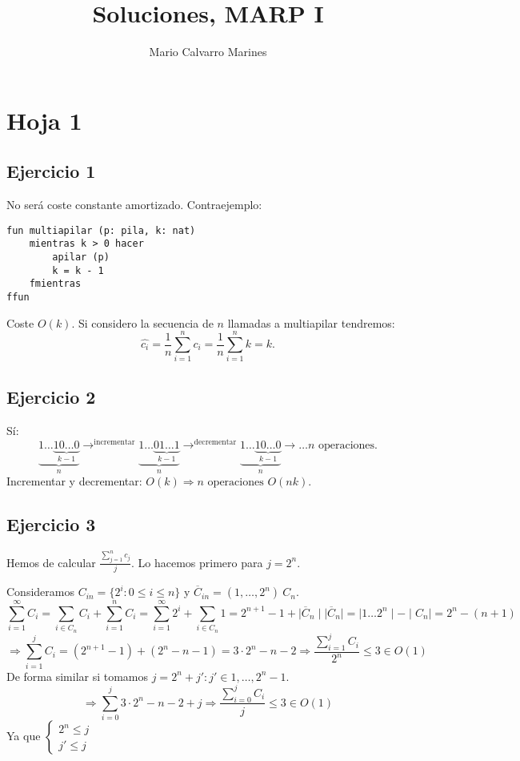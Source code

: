 \documentclass[10pt,a4paper,openright]{book}
\title{Soluciones, MARP I}
\author{Mario Calvarro Marines}
\date{}
\theoremstyle{break}
\begin{document}
\maketitle
\setcounter{tocdepth}{3}%
\tableofcontents
\chapter{Hoja 1}%
\label{cha:hoja_1}

\section{Ejercicio 1}%
\label{sec:ejercicio_1}
No será coste constante amortizado. Contraejemplo:
\begin{lstlisting}
fun multiapilar (p: pila, k: nat)
    mientras k > 0 hacer
        apilar (p)
        k = k - 1
    fmientras
ffun
\end{lstlisting}
Coste $O\left( k \right)$. Si considero la secuencia de $n$ llamadas a multiapilar tendremos:
\[
\hat{c_i} = \frac{1}{n} \sum_{i=1}^{n} c_i = \frac{1}{n} \sum_{i=1}^{n} k = k.  
\]

\section{Ejercicio 2}%
\label{sec:ejercicio_2}
Sí:
\[
\underbrace{1 \ldots \underbrace{10 \ldots 0}_{k - 1}}_{n} \rightarrow^{\text{incrementar}}  \underbrace{1 \ldots \underbrace{01 \ldots 1}_{k-1}}_{n} \rightarrow^{\text{decrementar}}  \underbrace{1 \ldots \underbrace{10 \ldots 0}_{k-1}}_{n} \rightarrow \ldots n \text{ operaciones.} 
\]
Incrementar y decrementar: $O\left( k \right) \Rightarrow n \text{ operaciones } O\left( nk \right)$.  

\section{Ejercicio 3}%
\label{sec:ejercicio_3}
Hemos de calcular $\frac{\sum_{j=1}^{n} c_j}{j}$. Lo hacemos primero para $j = 2^n$. 

Consideramos $C_{in} = \{2^i : 0 \le i \le n\}$ y $\overline{C}_{in} = \left( 1, \ldots, 2^n \right) \ C_n$. 
\[
\sum_{i=1}^{\infty} C_i = \sum_{i \in C_n} C_i + \sum_{i=1}^{n} C_i = \sum_{i=1}^{\infty} 2^i + \sum_{i \in C_n} 1 = 2^{n+1} - 1 + \mid \overline{C}_n \mid \mid \overline{C}_n\mid = \mid 1 \ldots 2^n\mid - \mid C_n \mid = 2^n - \left( n + 1 \right) 
\]\[
\Rightarrow \sum_{i=1}^{j} C_i = \left( 2^{n + 1} - 1 \right) + \left( 2^n - n - 1 \right) = 3 \cdot 2^n - n - 2 \Rightarrow \frac{\sum_{i=1}^{j} C_i}{2^n} \le 3 \in O\left( 1 \right) 
\]
De forma similar si tomamos $j = 2^n + j': j' \in 1, \ldots, 2^n - 1$.
\[
\Rightarrow \sum_{i=0}^{j} 3\cdot 2^n - n - 2 + j \Rightarrow \frac{\sum_{i=0}^{j} C_i}{j} \le 3 \in O\left( 1 \right)    
\]
Ya que $\begin{cases}
    2^n \le j\\
    j' \le j
\end{cases} $
\end{document}
